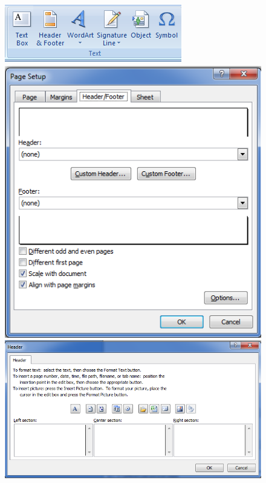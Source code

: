 \begin{figure}[H]
\centering
\includegraphics[scale=0.33]{src/images/chapter1/chapter1_fig43.png}\qquad
\includegraphics[scale=0.3]{src/images/chapter1/chapter1_fig44.png}\\[6pt]
\includegraphics[scale=0.38]{src/images/chapter1/chapter1_fig45.png}
\end{figure}
